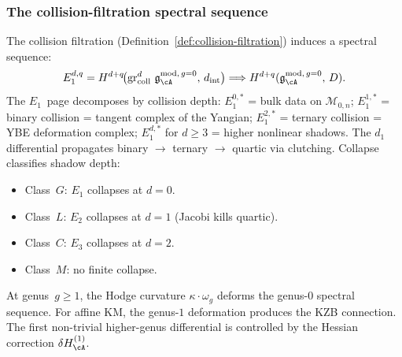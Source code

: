 \subsubsection{The collision-filtration spectral sequence}

\begin{construction}
\label{constr:holographic-spectral-sequence}
The collision filtration
(Definition~\ref{def:collision-filtration}) induces a spectral
sequence:
\begin{equation}\label{eq:holographic-spectral-sequence}
E_1^{d,q}
=
H^{d+q}\!\bigl(
 \operatorname{gr}^d_{\mathrm{coll}}\, \mathfrak{g}_{\cA}^{\mathrm{mod},\,g{=}0},\,
 d_{\mathrm{int}}\bigr)
\Longrightarrow
H^{d+q}(\mathfrak{g}_{\cA}^{\mathrm{mod},\,g{=}0},\, D).
\end{equation}
The $E_1$~page decomposes by collision depth:
$E_1^{0,*}$ = bulk data on $\mathcal{M}_{0,n}$;
$E_1^{1,*}$ = binary collision = tangent complex of the Yangian;
$E_1^{2,*}$ = ternary collision = YBE deformation complex;
$E_1^{d,*}$ for $d \geq 3$ = higher nonlinear shadows.
The $d_1$ differential propagates binary $\to$ ternary $\to$
quartic via clutching. Collapse classifies shadow depth:
\begin{itemize}
\item Class~$G$: $E_1$ collapses at $d = 0$.
\item Class~$L$: $E_2$ collapses at $d = 1$
 \textup{(}Jacobi kills quartic\textup{)}.
\item Class~$C$: $E_3$ collapses at $d = 2$.
\item Class~$M$: no finite collapse.
\end{itemize}
At genus~$g \geq 1$, the Hodge curvature $\kappa \cdot \omega_g$
deforms the genus-$0$ spectral sequence. For affine KM, the genus-$1$
deformation produces the KZB connection. The first non-trivial
higher-genus differential is controlled by the Hessian correction
$\delta H^{(1)}_\cA$.
\end{construction}

